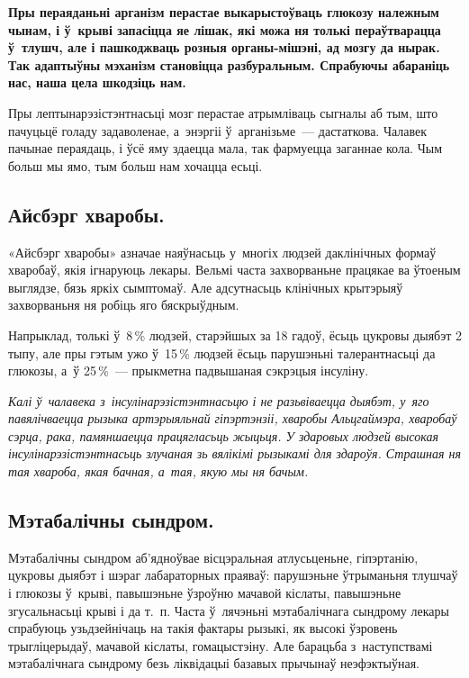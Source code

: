 \textbf{Пры пераяданьні арганізм перастае выкарыстоўваць глюкозу належным чынам, і ў~крыві запасіцца яе лішак, які можа ня толькі пераўтварацца ў~тлушч, але і пашкоджваць розныя органы-мішэні, ад мозгу да нырак. Так адаптыўны мэханізм становіцца разбуральным. Спрабуючы абараніць нас, наша цела шкодзіць нам.}

Пры лептынарэзістэнтнасьці мозг перастае атрымліваць сыгналы аб тым, што пачуцьцё голаду задаволенае, а~энэргіі ў~арганізьме~--- дастаткова. Чалавек пачынае пераядаць, і ўсё яму здаецца мала, так фармуецца заганнае кола. Чым больш мы ямо, тым больш нам хочацца есьці.

\subsection*{Айсбэрг хваробы.}

«Айсбэрг хваробы» азначае наяўнасьць у~многіх людзей даклінічных формаў хваробаў, якія ігнаруюць лекары. Вельмі часта захворваньне працякае ва ўтоеным выглядзе, бязь яркіх сымптомаў. Але адсутнасьць клінічных крытэрыяў захворваньня ня робіць яго бяскрыўдным. 

Напрыклад, толькі ў~8\,\% людзей, старэйшых за 18 гадоў, ёсьць цукровы дыябэт 2 тыпу, але пры гэтым ужо ў~15\,\% людзей ёсьць парушэньні талерантнасьці да глюкозы, а~ў 25\,\%~--- прыкметна падвышаная сэкрэцыя інсуліну.


\emph{Калі ў~чалавека з~інсулінарэзістэнтнасьцю і не разьвіваецца дыябэт, у~яго павялічваецца рызыка артэрыяльнай гіпэртэнзіі, хваробы Альцгаймэра, хваробаў сэрца, рака, памяншаецца працягласьць жыцьця. У здаровых людзей высокая інсулінарэзістэнтнасьць злучаная зь вялікімі рызыкамі для здароўя. Страшная ня тая хвароба, якая бачная, а~тая, якую мы ня бачым.}

\subsection*{Мэтабалічны сындром.}

Мэтабалічны сындром аб'ядноўвае вісцэральная атлусьценьне, гіпэртанію, цукровы дыябэт і шэраг лабараторных праяваў: парушэньне ўтрыманьня тлушчаў і глюкозы ў~крыві, павышэньне ўзроўню мачавой кіслаты, павышэньне згусальнасьці крыві і да т.~п. Часта ў~лячэньні мэтабалічнага сындрому лекары спрабуюць узьдзейнічаць на такія фактары рызыкі, як высокі ўзровень трыгліцерыдаў, мачавой кіслаты, гомацыстэіну. Але барацьба з~наступствамі мэтабалічнага сындрому безь ліквідацыі базавых прычынаў неэфэктыўная.


